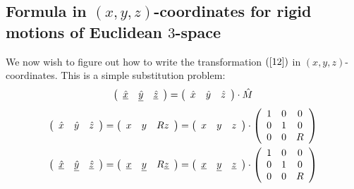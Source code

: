 \documentclass{ximera}
\begin{document}
\subsection*{Formula in $\left(  x,y,z\right)  $-coordinates for rigid motions
of Euclidean $3$-space}

We now wish to figure out how to write the transformation $\left(
\ref{12}\right)  $ in $\left(  x,y,z\right)  $-coordinates. This is a simple
substitution problem:%
\begin{equation}
\left(
\begin{array}
[c]{ccc}%
\underline{\hat{x}} & \underline{\hat{y}} & \underline{\hat{z}}%
\end{array}
\right)  =\left(
\begin{array}
[c]{ccc}%
\hat{x} & \hat{y} & \hat{z}%
\end{array}
\right)  \cdot\hat{M} \label{100}%
\end{equation}%
\begin{gather*}
\left(
\begin{array}
[c]{ccc}%
\hat{x} & \hat{y} & \hat{z}%
\end{array}
\right)  =\left(
\begin{array}
[c]{ccc}%
x & y & Rz
\end{array}
\right)  =\left(
\begin{array}
[c]{ccc}%
x & y & z
\end{array}
\right)  \cdot\left(
\begin{array}
[c]{ccc}%
1 & 0 & 0\\
0 & 1 & 0\\
0 & 0 & R
\end{array}
\right) \\
\left(
\begin{array}
[c]{ccc}%
\underline{\hat{x}} & \underline{\hat{y}} & \underline{\hat{z}}%
\end{array}
\right)  =\left(
\begin{array}
[c]{ccc}%
\underline{x} & \underline{y} & R\underline{z}%
\end{array}
\right)  =\left(
\begin{array}
[c]{ccc}%
\underline{x} & \underline{y} & \underline{z}%
\end{array}
\right)  \cdot\left(
\begin{array}
[c]{ccc}%
1 & 0 & 0\\
0 & 1 & 0\\
0 & 0 & R
\end{array}
\right)
\end{gather*}
\end{document}
